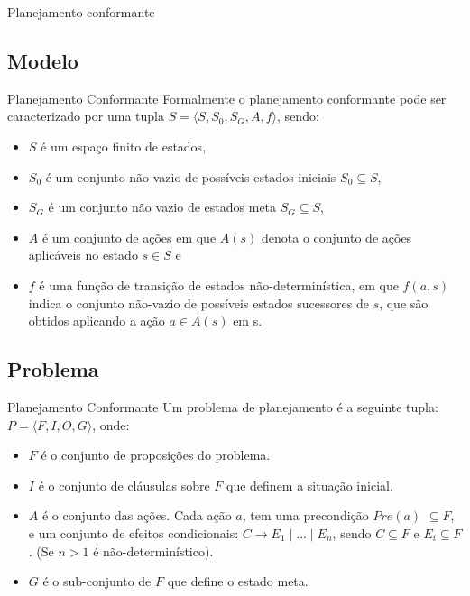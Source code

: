 \begin{frame}{Planejamento conformante}
\begin{figure}
\end{figure}

\end{frame}

\subsection{Modelo}
\begin{frame}{Planejamento Conformante}
Formalmente o planejamento conformante pode ser caracterizado por uma tupla 
$S=\langle S, S_0, S_G, A, f \rangle$, sendo:
\begin{itemize}
\item $S$ é um espaço finito de estados,
\item $S_0$ é um conjunto não vazio de possíveis estados iniciais $S_0\subseteq 
S$,
\item $S_G$ é um conjunto não vazio de estados meta $S_G \subseteq S$,
\item $A$ é um conjunto de ações em que $A(s)$ denota o conjunto de ações 
aplicáveis no estado $s \in S$ e
\item $f$ é uma função de transição de estados não-determinística, em que 
$f(a,s)$ indica o conjunto não-vazio de possíveis estados sucessores de $s$, que 
são obtidos aplicando a ação $a \in A(s)$ em s.
\end{itemize}
\end{frame}

\subsection{Problema}
\begin{frame}{Planejamento Conformante}
Um problema de planejamento é a seguinte tupla: $P=\langle F, I, O, G\rangle$, 
onde:
\begin{itemize}
 \item $F$ é o conjunto de proposições do problema.
 \item $I$ é o conjunto de cláusulas sobre $F$ que definem a situação inicial.
 \item $A$ é o conjunto das ações. Cada ação $a$, tem uma precondição $Pre(a)$ 
$\subseteq F$, e um conjunto de efeitos condicionais: $C\rightarrow E_1 \mid ... 
\mid E_n$, sendo $C\subseteq F$ e $E_i \subseteq F$. (Se $n > 1$ é 
não-determinístico). 
 \item $G$ é o sub-conjunto de $F$ que define o estado meta. 
\end{itemize}

\end{frame}


